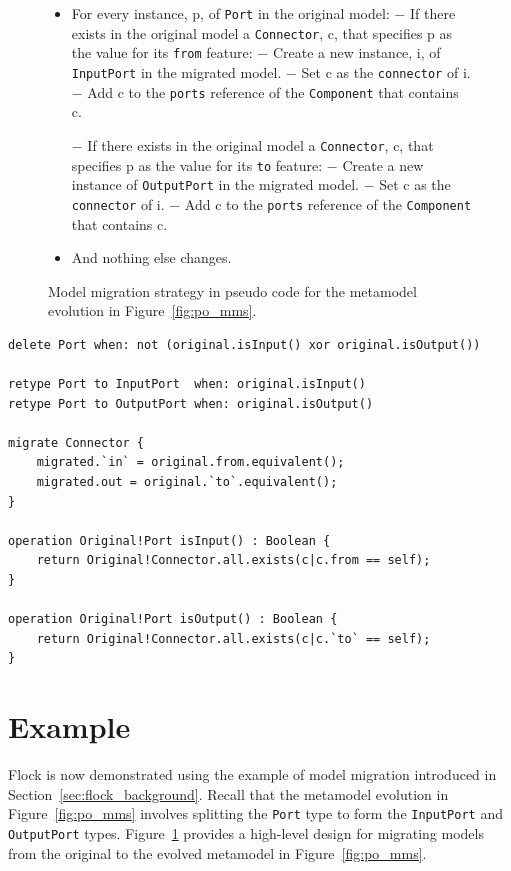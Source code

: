 \begin{figure}[tbp]
	\begin{framed}
		\footnotesize
		\begin{itemize}
			\item For every instance, p, of \texttt{Port} in the original model: 
			\subitem $-$ If there exists in the original model a \texttt{Connector}, c, that specifies p as the value for its \texttt{from} feature:
			\subsubitem $-$ Create a new instance, i, of \texttt{InputPort} in the migrated model.
			\subsubitem $-$ Set c as the \texttt{connector} of i.
			\subsubitem $-$ Add c to the \texttt{ports} reference of the \texttt{Component} that contains c.
	
			\subitem $-$ If there exists in the original model a \texttt{Connector}, c, that specifies p as the value for its \texttt{to} feature:
			\subsubitem $-$ Create a new instance of \texttt{OutputPort} in the migrated model.
			\subsubitem $-$ Set c as the \texttt{connector} of i.
			\subsubitem $-$ Add c to the \texttt{ports} reference of the \texttt{Component} that contains c.

			\item And nothing else changes.
		\end{itemize}
	\end{framed}
	\caption{Model migration strategy in pseudo code for the metamodel evolution in Figure~\ref{fig:po_mms}.}
	\label{fig:po_migration_strategy}
\end{figure}

\begin{lstlisting}[float=tbp, caption=Flock migration strategy for the process-oriented metamodel evolution in Figure~\ref{fig:po_mms}, label=lst:flock, language=Flock]
delete Port when: not (original.isInput() xor original.isOutput())

retype Port to InputPort  when: original.isInput()
retype Port to OutputPort when: original.isOutput()

migrate Connector {
	migrated.`in` = original.from.equivalent();
	migrated.out = original.`to`.equivalent();
}

operation Original!Port isInput() : Boolean {
	return Original!Connector.all.exists(c|c.from == self);
}

operation Original!Port isOutput() : Boolean {
	return Original!Connector.all.exists(c|c.`to` == self);
}
\end{lstlisting}

\section{Example}
Flock is now demonstrated using the example of model migration introduced in Section~\ref{sec:flock_background}. Recall that the metamodel evolution in Figure~\ref{fig:po_mms} involves splitting the \texttt{Po\-rt} type to form the \texttt{In\-p\-utPo\-rt} and \texttt{Ou\-tp\-utPo\-rt} types. Figure~\ref{fig:po_migration_strategy} provides a high-level design for migrating models from the original to the evolved metamodel in Figure~\ref{fig:po_mms}.


